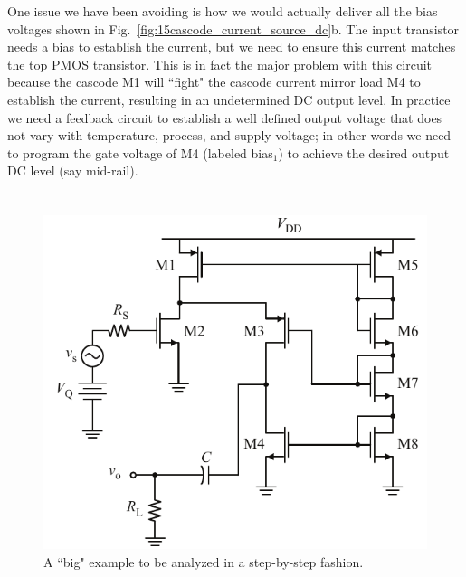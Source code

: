 One issue we have been avoiding is how we would actually deliver all the bias voltages shown in Fig.~\ref{fig:15cascode_current_source_dc}b.  The input transistor needs a bias to establish the current, but we need to ensure this current matches the top PMOS transistor.  This is in fact the major problem with this circuit because the cascode M1 will ``fight" the cascode current mirror load M4 to establish the current, resulting in an undetermined DC output level.  In practice we need a feedback circuit to establish a well defined output voltage that does not vary with temperature, process, and supply voltage; in other words we need to program the gate voltage of M4 (labeled bias$_1$) to achieve the desired output DC level (say mid-rail).
\section{\topicE}
\begin{figure}[tb]
\begin{center}
\includegraphics[scale=1]{16cascode_folded}
\end{center}
\caption{A ``big" example to be analyzed in a step-by-step fashion.}
\label{fig:16cascode_folded}
\end{figure}

